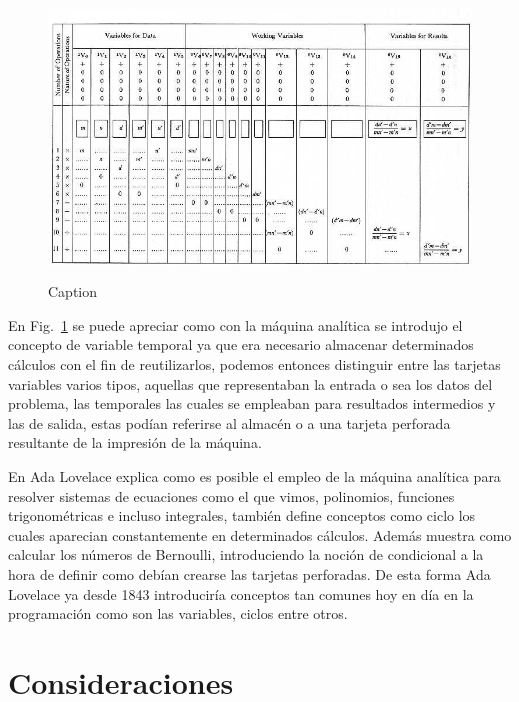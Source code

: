 \documentclass[runningheads,a4paper]{llncs}
\begin{document}
\begin{figure}
	\centering
	\includegraphics[height=7.4cm]{imgs/ltable}
	\caption{Caption}
	\label{fig:ltable}
\end{figure}

En Fig.~\ref{fig:ltable} se puede apreciar como con la máquina analítica se introdujo el concepto de variable temporal ya que era necesario almacenar determinados cálculos con el fin de reutilizarlos, podemos entonces distinguir entre las tarjetas variables varios tipos, aquellas que representaban la entrada o sea los datos del problema, las temporales las cuales se empleaban para resultados intermedios y las de salida, estas podían referirse al almacén o a una tarjeta perforada resultante de la impresión de la máquina. 

\newpage

En \cite{lovelace} Ada Lovelace explica como es posible el empleo de la máquina analítica para resolver sistemas de ecuaciones como el que vimos, polinomios, funciones trigonométricas e incluso integrales, también define conceptos como ciclo los cuales aparecian constantemente en determinados cálculos. Además muestra como calcular los números de Bernoulli, introduciendo la noción de condicional a la hora de definir como debían crearse las tarjetas perforadas.
De esta forma Ada Lovelace ya desde 1843 introduciría conceptos tan comunes hoy en día en la programación como son las variables, ciclos entre otros.

\section{Consideraciones}
\end{document}
